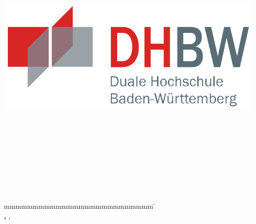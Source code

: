 
\begin{titlepage}
	\begin{center}
	    \includegraphics[height=0.1\textwidth]{data/images/dhbw.png}	    
	\end{center}

	\enlargethispage{15mm}
	\begin{center}
		\vspace*{10mm}	{\LARGE\textbf \titel \par}
		\vspace*{10mm}	{\large\textbf \arbeit}\\
		\vspace*{10mm}	\langdeckblattabschlusshinleitung\\
		\vspace*{3mm}		{\textbf \abschluss}\\
		\vspace*{10mm}	\langartikelstudiengang{} \langstudiengang{} \studiengang\\
		\vspace*{3mm}		\langanderdh{} \dhbw\\
		\vspace*{10mm}	\langvon\\
		\vspace*{3mm}		{\large\textbf \autor}\\
		\vspace*{10mm}	\datumAbgabe\\
		\vspace*{10mm}
	\end{center}
	\vfill
	\begin{spacing}{1.2}
		\begin{tabbing}
			mmmmmmmmmmmmmmmmmmmmmmmmmm             \= \kill
			\textbf{\langdbbearbeitungszeit}       \>  \zeitraum\\
			\textbf{\langdbmatriknr, \langdbkurs}  \>  \martrikelnr, \kurs\\
			\textbf{\langdbbetreuer}               \>  \betreuer\\
		\end{tabbing}
	\end{spacing}
\end{titlepage}
